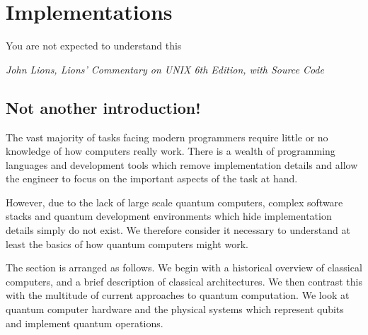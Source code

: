 \chapter{Implementations}
\label{chpt:implementations}

\epigraph{You are not expected to understand this}{\textit{John Lions, Lions' Commentary on UNIX 6th Edition, with Source Code}}



\section{Not another introduction!}

The vast majority of tasks facing modern programmers require little or no knowledge of how computers really work. There is a wealth of programming languages and development tools which remove implementation details and allow the engineer to focus on the important aspects of the task at hand.

However, due to the lack of large scale quantum computers, complex software stacks and quantum development environments which hide implementation details simply do not exist. We therefore consider it necessary to understand at least the basics of how quantum computers might work.

The section is arranged as follows. We begin with a historical overview of classical computers, and a brief description of classical architectures. We then contrast this with the multitude of current approaches to quantum computation. We look at quantum computer hardware and the physical systems which represent qubits and implement quantum operations. 

